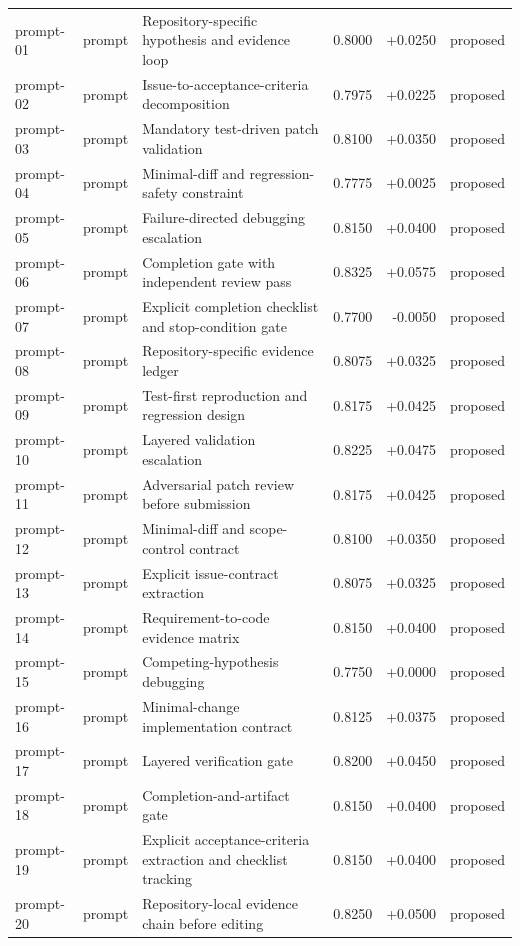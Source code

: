 \begin{center}
\begin{longtable}{llp{5.2cm}rrl}
prompt-01 & prompt & Repository-specific hypothesis and evidence loop & 0.8000 & +0.0250 & proposed \\
prompt-02 & prompt & Issue-to-acceptance-criteria decomposition & 0.7975 & +0.0225 & proposed \\
prompt-03 & prompt & Mandatory test-driven patch validation & 0.8100 & +0.0350 & proposed \\
prompt-04 & prompt & Minimal-diff and regression-safety constraint & 0.7775 & +0.0025 & proposed \\
prompt-05 & prompt & Failure-directed debugging escalation & 0.8150 & +0.0400 & proposed \\
prompt-06 & prompt & Completion gate with independent review pass & 0.8325 & +0.0575 & proposed \\
prompt-07 & prompt & Explicit completion checklist and stop-condition gate & 0.7700 & -0.0050 & proposed \\
prompt-08 & prompt & Repository-specific evidence ledger & 0.8075 & +0.0325 & proposed \\
prompt-09 & prompt & Test-first reproduction and regression design & 0.8175 & +0.0425 & proposed \\
prompt-10 & prompt & Layered validation escalation & 0.8225 & +0.0475 & proposed \\
prompt-11 & prompt & Adversarial patch review before submission & 0.8175 & +0.0425 & proposed \\
prompt-12 & prompt & Minimal-diff and scope-control contract & 0.8100 & +0.0350 & proposed \\
prompt-13 & prompt & Explicit issue-contract extraction & 0.8075 & +0.0325 & proposed \\
prompt-14 & prompt & Requirement-to-code evidence matrix & 0.8150 & +0.0400 & proposed \\
prompt-15 & prompt & Competing-hypothesis debugging & 0.7750 & +0.0000 & proposed \\
prompt-16 & prompt & Minimal-change implementation contract & 0.8125 & +0.0375 & proposed \\
prompt-17 & prompt & Layered verification gate & 0.8200 & +0.0450 & proposed \\
prompt-18 & prompt & Completion-and-artifact gate & 0.8150 & +0.0400 & proposed \\
prompt-19 & prompt & Explicit acceptance-criteria extraction and checklist tracking & 0.8150 & +0.0400 & proposed \\
prompt-20 & prompt & Repository-local evidence chain before editing & 0.8250 & +0.0500 & proposed \\

\end{longtable}
\end{center}
